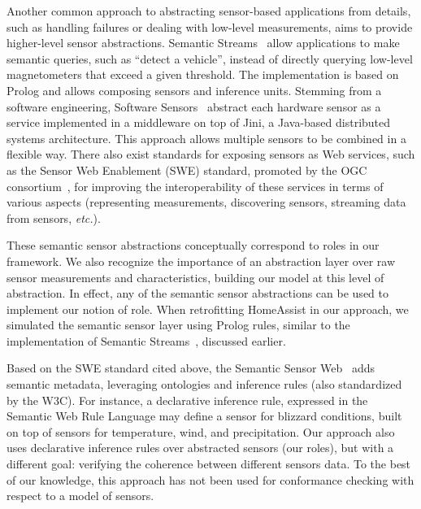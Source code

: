Another common approach to abstracting sensor-based applications from details, such as handling failures or dealing with low-level measurements, aims to provide higher-level sensor abstractions.
Semantic Streams~\cite{WHITEHOUSE-SEMANTICS-WIRELESS2006} allow applications to make semantic queries, such as ``detect a vehicle'', instead of directly querying low-level magnetometers that exceed a given threshold. The implementation is based on Prolog and allows composing sensors and inference units.
Stemming from a software engineering, Software Sensors~\cite{LIN-SOFTWARE-UCSD2004} abstract each hardware sensor as a service implemented in a middleware on top of Jini, a Java-based distributed systems architecture. This approach allows multiple sensors to be combined in a flexible way.  There also exist standards for exposing sensors as Web services, such as the Sensor Web Enablement (SWE) standard, promoted by the OGC consortium~\cite{ogc-swe-07}, for improving the interoperability of these services in terms of various aspects (representing measurements, discovering sensors, streaming data from sensors, {\em etc.}).

These semantic sensor abstractions conceptually correspond to roles in our framework. We also recognize the importance of an abstraction layer over raw sensor measurements and characteristics, building our model at this level of abstraction. In effect, any of the semantic sensor abstractions can be used to implement our notion of role. When retrofitting HomeAssist in our approach, we simulated the semantic sensor layer using Prolog rules, similar to the implementation of Semantic Streams~\cite{WHITEHOUSE-SEMANTICS-WIRELESS2006}, discussed earlier.

Based on the SWE standard cited above, the Semantic Sensor Web~\cite{ssw-08} adds semantic metadata, leveraging ontologies and inference rules (also standardized by the W3C). For instance, a declarative inference rule, expressed in the Semantic Web Rule Language may define a sensor for blizzard conditions, built on top of sensors for temperature, wind, and precipitation. Our approach also uses declarative inference rules over abstracted sensors (our roles), but with a different goal: verifying the coherence between different sensors data.  To the best of our knowledge, this approach has not been used for conformance checking with respect to a model of sensors.

